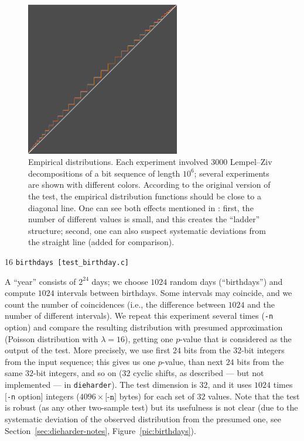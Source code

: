 \documentclass[12pt,a4paper,fullpage]{article}
\begin{document}
\begin{description}
\begin{figure}
\begin{center}
\includegraphics[width=0.6\textwidth]{pdfs/nist-lz.pdf}
\end{center}
\caption{Empirical distributions. Each experiment involved $3000$ Lempel--Ziv decompositions of a bit sequence of length $10^6$; several experiments are shown with different colors. According to the original version of the test, the empirical distribution functions should be close to a diagonal line. One can see both effects mentioned in \cite{kim-umeno-hasegawa}: first, the number of different values is small, and this creates the ``ladder'' structure; second, one can also suspect systematic deviations from the straight line (added for comparison).}
\label{fig:nist-lz}
\end{figure}

\item{16} \texttt{birthdays [test\_birthday.c]}

A ``year'' consists of $2^{24}$ days; we choose $1024$ random days (``birthdays'') and compute $1024$ intervals between birthdays. Some intervals may coincide, and we count the number of coincidences (i.e., the difference between $1024$ and the number of different intervals). We repeat this experiment several times  (\texttt{-n} option) and compare the resulting distribution with presumed approximation (Poisson distribution with $\lambda=16$), getting one $p$-value that is considered as the output of the test. More precisely, we use first $24$ bits from the $32$-bit integers from the input sequence; this gives us one $p$-value, than next $24$ bits from the same $32$-bit integers, and so on ($32$ cyclic shifts, as described --- but not implemented --- in \texttt{dieharder}). The test dimension is $32$, and it uses $1024$ times [\texttt{-n} option] integers ($4096\times \texttt{[-n]}$ bytes) for each set of $32$ values. Note that the test is robust (as any other two-sample test) but its usefulness is not clear (due to the systematic deviation of the observed distribution from the presumed one, see Section~\ref{sec:dieharder-notes}, Figure~\ref{pic:birthdays}).


\end{description}
\end{document}
